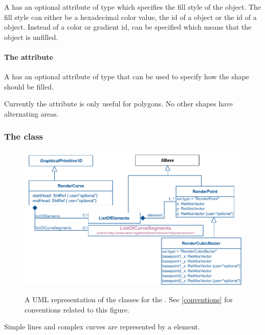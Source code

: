 A \GraphicalPrimitiveTwoD has an optional attribute  of type
 which specifies 
the fill style of the object. The fill style can either be a hexadecimal
color value, the id of a \ColorDefinition object or the id of a \GradientBase
object. 
Instead of a color or gradient id,  can be specified
 which means that the object is unfilled.


\paragraph{The \fixttspace{} attribute}

A \GraphicalPrimitiveTwoD has an optional attribute  of
type \FillRule that can be used to specify how the shape should be filled. 

Currently the  attribute is only useful for polygons. No other shapes have alternating areas.

\subsubsection{The  class}
\label{rendercurve-class}
\begin{figure}[!h]
  \centering
  \includegraphics{images/render-curve-uml}\\
  \caption{A UML representation of the \RenderCurve classes for the \RenderPackage.  See \ref{conventions} for conventions related to this figure. }
  \label{fig:curve_render_uml}
\end{figure}

Simple lines and complex curves are represented by a \RenderCurve element. 

